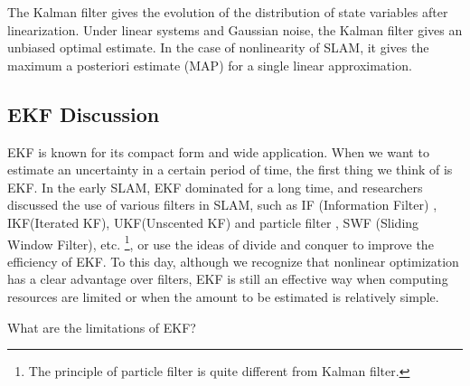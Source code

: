 The Kalman filter gives the evolution of the distribution of state variables after linearization. Under linear systems and Gaussian noise, the Kalman filter gives an unbiased optimal estimate. In the case of nonlinearity of SLAM, it gives the maximum a posteriori estimate (MAP) for a single linear approximation.

\subsection{EKF Discussion}
EKF is known for its compact form and wide application. When we want to estimate an uncertainty in a certain period of time, the first thing we think of is EKF. In the early SLAM, EKF dominated for a long time, and researchers discussed the use of various filters in SLAM, such as IF (Information Filter)\textsuperscript{\cite{Sujan2005} }, IKF\textsuperscript{\cite{Janabi-Sharifi2010}}(Iterated KF), UKF\textsuperscript{\cite{Li2010}}(Unscented KF) and particle filter\textsuperscript{\cite{Sim2007, Lee2011, Gil2010a}} , SWF (Sliding Window \mbox{Filter)\textsuperscript{\cite{Sibley2010}}}, etc. \textsuperscript{\cite{Chen2012}}\footnote{The principle of particle filter is quite different from Kalman filter. }, or use the ideas of divide and conquer to improve the efficiency of EKF\textsuperscript{\cite{Paz2008, Grasa2011}}. To this day, although we recognize that nonlinear optimization has a clear advantage over filters, EKF is still an effective way when computing resources are limited or when the amount to be estimated is relatively simple.

What are the limitations of EKF?

